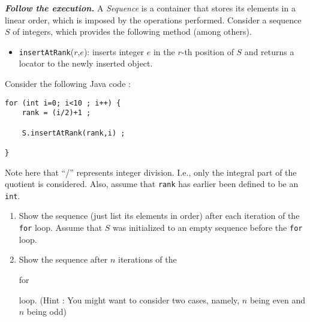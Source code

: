 {\large\bfseries\itshape Follow the execution.} 
A {\it Sequence} is a container that stores its elements in a
linear order, which is imposed by the operations performed. Consider a
sequence $S$ of integers, which provides the following method (among
others).
\begin{itemize}
\item[]  \texttt{insertAtRank}($r$,$e$): inserts integer $e$ in the
  $r$-th position of $S$ and returns a locator to the newly inserted
  object.
\end{itemize}
Consider the following Java code :
\begin{verbatim}
for (int i=0; i<10 ; i++) {
    rank = (i/2)+1 ;

    S.insertAtRank(rank,i) ;

}
\end{verbatim}

Note here that ``/'' represents integer division.  I.e., only the
integral part of the quotient is considered.  Also, assume that \texttt{rank}
has earlier been defined to be an \texttt{int}.


\begin{enumerate}
\item  Show the sequence (just list its elements in order) after
each iteration of the {\tt for} loop. Assume that $S$ was initialized
to an empty sequence before the {\tt for} loop.

\item  Show the sequence after $n$ iterations of the {\tt

for} loop. (Hint : You might want to consider two cases, namely, $n$
being even and $n$ being odd)
\end{enumerate}

